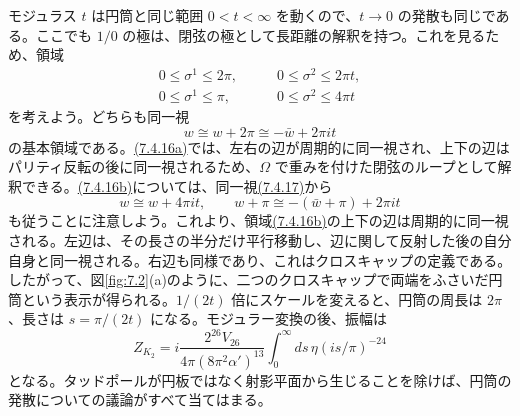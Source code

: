 モジュラス $t$ は円筒と同じ範囲 $0<t<\infty$ を動くので、$t\to0$ の発散も同じである。ここでも $1/0$ の極は、閉弦の極として長距離の解釈を持つ。これを見るため、領域
\begin{align}
0\leq\sigma^1\leq2\pi,\qquad&0\leq\sigma^2\leq2\pi t,
\tag{7.4.16a}\label{eq:7.4.16a}\\
0\leq\sigma^1\leq\pi,\qquad&0\leq\sigma^2\leq4\pi t
\tag{7.4.16b}\label{eq:7.4.16b}
\end{align}
を考えよう。どちらも同一視
\begin{equation}
w\cong w+2\pi\cong-\bar w+2\pi it
\tag{7.4.17}\label{eq:7.4.17}
\end{equation}
の基本領域である。\hyperref[eq:7.4.16a]{(7.4.16a)}では、左右の辺が周期的に同一視され、上下の辺はパリティ反転の後に同一視されるため、$\Omega$ で重みを付けた閉弦のループとして解釈できる。\hyperref[eq:7.4.16b]{(7.4.16b)}については、同一視\hyperref[eq:7.4.17]{(7.4.17)}から
\begin{equation}
w\cong w+4\pi it,\qquad
w+\pi\cong-(\bar w+\pi)+2\pi it
\tag{7.4.18}\label{eq:7.4.18}
\end{equation}
も従うことに注意しよう。これより、領域\hyperref[eq:7.4.16b]{(7.4.16b)}の上下の辺は周期的に同一視される。左辺は、その長さの半分だけ平行移動し、辺に関して反射した後の自分自身と同一視される。右辺も同様であり、これはクロスキャップの定義である。したがって、図\ref{fig:7.2}(a)のように、二つのクロスキャップで両端をふさいだ円筒という表示が得られる。$1/(2t)$ 倍にスケールを変えると、円筒の周長は $2\pi$、長さは $s=\pi/(2t)$ になる。モジュラー変換の後、振幅は
\begin{equation}
Z_{K_2}=i\frac{2^{26}V_{26}}{4\pi(8\pi^2\alpha')^{13}}
\int_0^\infty ds\,\eta(is/\pi)^{-24}
\tag{7.4.19}\label{eq:7.4.19}
\end{equation}
となる。タッドポールが円板ではなく射影平面から生じることを除けば、円筒の発散についての議論がすべて当てはまる。


